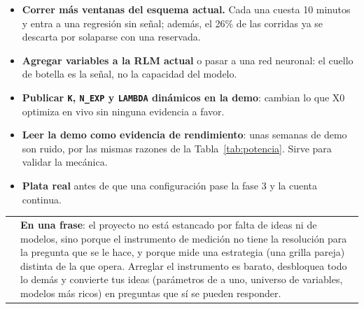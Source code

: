 \documentclass[11pt,a4paper]{article}
\makeatletter
\newcommand{\code}[1]{\texttt{\small #1}}
\newenvironment{caja}[1]{%
  \par\medskip\noindent
  \begin{tabular}{@{}p{0.4em}@{\hspace{8pt}}p{\dimexpr\linewidth-2em\relax}@{}}
  \textcolor{#1}{\rule{3pt}{1.1em}} &
}{\end{tabular}\par\medskip}
\newenvironment{clave}{\begin{caja}{cmorado}}{\end{caja}}
\makeatother
\begin{document}
\begin{itemize}[leftmargin=1.2em]
  \item \textbf{Correr más ventanas del esquema actual.} Cada una cuesta 10 minutos y entra a una regresión
        sin señal; además, el 26\% de las corridas ya se descarta por solaparse con una reservada.
  \item \textbf{Agregar variables a la RLM actual} o pasar a una red neuronal: el cuello de botella es la
        señal, no la capacidad del modelo.
  \item \textbf{Publicar \code{K}, \code{N\_EXP} y \code{LAMBDA} dinámicos en la demo}: cambian lo que X0
        optimiza en vivo sin ninguna evidencia a favor.
  \item \textbf{Leer la demo como evidencia de rendimiento}: unas semanas de demo son ruido, por las mismas
        razones de la Tabla~\ref{tab:potencia}. Sirve para validar la mecánica.
  \item \textbf{Plata real} antes de que una configuración pase la fase 3 y la cuenta continua.
\end{itemize}

\begin{clave}
\textbf{En una frase}: el proyecto no está estancado por falta de ideas ni de modelos, sino porque el
instrumento de medición no tiene la resolución para la pregunta que se le hace, y porque mide una
estrategia (una grilla pareja) distinta de la que opera. Arreglar el instrumento es barato, desbloquea todo
lo demás y convierte tus ideas (parámetros de a uno, universo de variables, modelos más ricos) en preguntas
que sí se pueden responder.
\end{clave}
\end{document}
